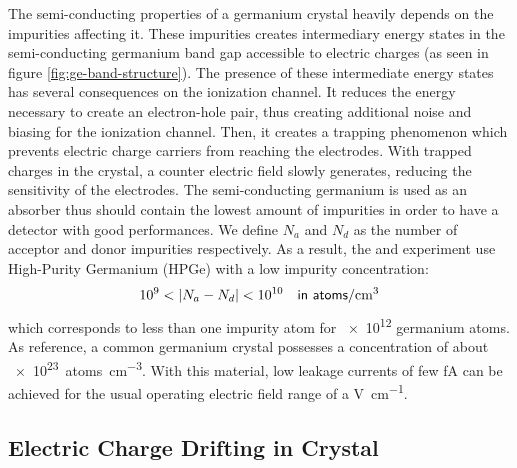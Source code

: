 The semi-conducting properties of a germanium crystal heavily depends on the impurities affecting it.
These impurities creates intermediary energy states in the semi-conducting germanium band gap accessible to electric charges (as seen in figure \ref{fig:ge-band-structure}). The presence of these intermediate energy states  has several consequences on the ionization channel. It reduces the energy necessary to create an electron-hole pair, thus creating additional noise and biasing for the ionization channel. Then, it creates a trapping phenomenon which prevents electric charge carriers from reaching the electrodes. With trapped charges in the crystal, a counter electric field slowly generates, reducing the sensitivity of the electrodes.
The semi-conducting germanium is used as an absorber thus should contain the lowest amount of impurities in order to have a detector with good performances.
We define $N_a$ and $N_d$ as the number of acceptor and donor impurities respectively.
As a result, the \Edelweiss{} and \Ricochet{} experiment use High-Purity Germanium (HPGe) with a low impurity concentration:
\begin{equation}
10^{9} < |N_a - N_d| < 10^{10} \quad \textsf{in \si{\textsf{atoms}\per\cm^{3}}}
\end{equation}
which corresponds to less than one impurity atom for \num{e12} germanium atoms. As reference, a common germanium crystal possesses a concentration of about \SI{e23}{\textsf{atoms}\per\cm^{3}}.  With this material, low leakage currents of few \si{\femto\ampere} can be achieved for the usual operating electric field range of a \si{\volt\per\cm}.


\subsection{Electric Charge Drifting in Crystal}
\label{par:charge-drifting}
\label{par:charge-drift}
\label{par:trapping}


